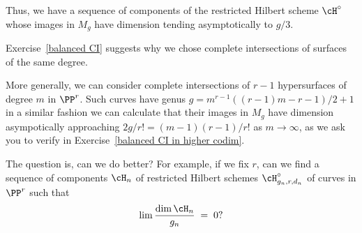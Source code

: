 Thus, we have a sequence of components of the restricted Hilbert scheme $\cH^\circ$ whose images in $M_g$ have dimension tending asymptotically to $g/3$.

Exercise~\ref{balanced CI}  suggests why we chose complete intersections of surfaces of the same degree.


More generally, we can consider complete intersections of $r-1$ hypersurfaces of degree $m$ in $\PP^r$. Such curves have
genus $g = m^{r-1}((r-1)m-r-1)/2 +1$ in a similar fashion we can calculate that their images in $M_g$ have dimension asympotically approaching $2g/r!= (m-1)(r-1)/r!$
 as $m \to \infty$, as we ask you to verify in Exercise~\ref{balanced CI in higher codim}.


The question is, can we do better? For example, if we fix $r$, can we find a sequence of components $\cH_n$ of  restricted Hilbert schemes  $\cH^\circ_{g_n,r,d_n}$ of curves in $\PP^r$ such that
$$
\lim \frac{\dim \cH_n}{g_n} \; = \; 0?
$$

